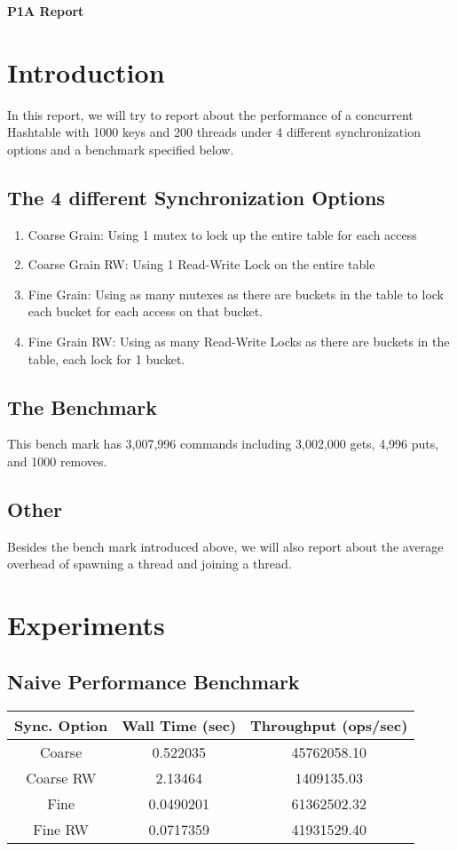 \documentclass[11pt]{article}
\begin{document}
\centerline{\Large\textbf{P1A Report}}
\vspace{0.3cm}
\section{Introduction}
In this report, we will try to report about the performance of a concurrent Hashtable with 1000 keys and 200 threads under 4 different synchronization options and a benchmark specified below.
\subsection{The 4 different Synchronization Options}
\begin{enumerate}
	\item Coarse Grain: Using 1 mutex to lock up the entire table for each access
	\item Coarse Grain RW: Using 1 Read-Write Lock on the entire table
	\item Fine Grain: Using as many mutexes as there are buckets in the table to lock each bucket for each access on that bucket.
	\item Fine Grain RW: Using as many Read-Write Locks as there are buckets in the table, each lock for 1 bucket.
\end{enumerate}
\subsection{The Benchmark}
This bench mark has 3,007,996 commands including 3,002,000 gets, 4,996 puts, and 1000 removes.
\subsection{Other}
Besides the bench mark introduced above, we will also report about the average overhead of spawning a thread and joining a thread.
\section{Experiments}
\subsection{Naive Performance Benchmark}
\begin{table}[H]
	\centering
	\begin{tabular}{|c|c|c|}
		\hline
		Sync. Option &Wall Time (sec)	&Throughput (ops/sec)	\\
		\hline
		Coarse &0.522035	&45762058.10\\
		\hline
		Coarse RW	&2.13464	&1409135.03\\
		\hline
		Fine	&0.0490201	&61362502.32\\
		\hline
		Fine RW	&0.0717359	&41931529.40\\
		\hline
	\end{tabular}
\end{table}
\end{document}
